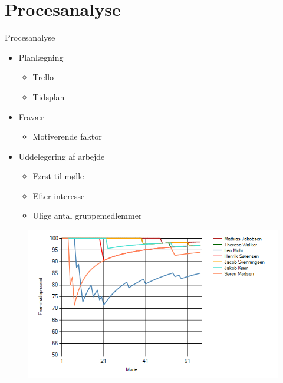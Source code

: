 
\section{Procesanalyse}
\begin{frame}{Procesanalyse}{}
	\begin{itemize}
		\item Planlægning
        \begin{itemize}
            \item Trello
            \item Tidsplan
        \end{itemize}
    \item Fravær
        \begin{itemize}
            \item Motiverende faktor
        \end{itemize}
		\item Uddelegering af arbejde
        \begin{itemize}
            \item Først til mølle
            \item Efter interesse
            \item Ulige antal gruppemedlemmer
        \end{itemize}
	\end{itemize}
  
  \begin{figure}
    \centering
    \includegraphics[width=.6\textwidth]{figures/graph.png}
  \end{figure}
  
\end{frame}

